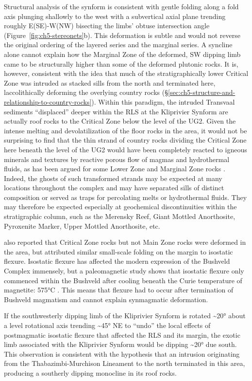 Structural analysis of the synform is consistent with gentle folding
along a fold axis plunging shallowly to the west with a subvertical
axial plane trending roughly E(SE)-W(NW) bisecting the limbs' obtuse
intersection angle (Figure~\ref{fig:ch5-stereonets}b). This deformation is subtle and would not
reverse the original ordering of the layered series and the marginal
series. A syncline alone cannot explain how the Marginal Zone of the
deformed, SW dipping limb came to be structurally higher than some of
the deformed plutonic rocks. It is, however, consistent with the idea
that much of the stratigraphically lower Critical Zone was intruded as
stacked sills from the north and terminated here, laccolithically deforming the overlying country rocks (\S\ref{sec:ch5-structure-and-relationship-to-country-rocks}). Within this paradigm, the
intruded Transvaal sediments ``displaced'' deeper within the RLS at the
Kliprivier Synform are actually roof rocks to the Critical Zone below
the level of the UG2. Given the intense melting and devolatilization of
the floor rocks in the area, it would not be surprising to find that the
thin strand of country rocks dividing the Critical Zone here beneath the
level of the UG2 would have been completely reacted to igneous minerals
and textures by reactive porous flow of magmas and hydrothermal fluids,
as has been argued for some Lower Zone and Marginal Zone rocks
\citep{yudovskaya2021}. Indeed, the ghosts of such transformed strands
may be expected at many locations throughout the complex and may have
separated sills of distinct composition or served as traps for
percolating melts or hydrothermal fluids. They may therefore be expected
especially at geochemical discontinuities within the stratigraphic
column, such as the Merensky Reef, Giant Mottled Anorthosite, Pyroxenite
Marker, Upper Mottled Anorthosite, etc.

\citet{sharpe1982} also reported that Critical Zone rocks but not
Main Zone rocks were deformed in the area, but attributed similar
small-scale folding on the margin to isostatic flexure. Isostatic
flexure has affected the modern expression of the Bushveld Complex
immensely, but a paleomagnetic study shows that isostatic flexure only
commenced within the Bushveld after cooling beneath the Curie
temperature of magnetite: 575°C \citep{hattingh1986}. This means that
flexure had to occur after termination of Bushveld magmatism and cannot explain synmagmatic
deformation. 

If the southwesterly dipping limb of the Kliprivier Synform is rotated
\textasciitilde20° about a level rotational axis trending
\textasciitilde45° NE to ``undo'' the local effects of postmagmatic
isostatic flexure that affected the RLS and its margin, the exotic limb
associated with the Kliprivier Synform would be dipping
\textasciitilde20° due south. This observation is consistent with the
hypothesis that an intrusion originating from the Thabazimbi-Murchison
Lineament to the north terminated in this area, producing a southerly
dipping monocline in its roof rocks.


